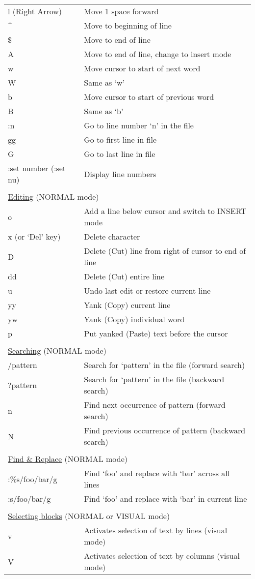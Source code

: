 \documentclass[11pt,a4paper,oneside]{article}
\begin{document}
\begin{table}
\begin{tabular}{p{4.5cm} l}
l (Right Arrow) & Move 1 space forward \\
\^{} & Move to beginning of line \\
\$ & Move to end of line \\
A & Move to end of line, change to insert mode \\
w & Move cursor to start of next word \\
W & Same as `w' \\
b & Move cursor to start of previous word \\
B & Same as `b' \\
:n & Go to line number `n' in the file \\
gg & Go to first line in file \\
G & Go to last line in file \\
:set number (:set nu) & Display line numbers \\
 & \\[-1.5ex]
\multicolumn{2}{l}{\underline{Editing} (NORMAL mode)} \\
o & Add a line below cursor and switch to INSERT mode \\
x (or `Del' key) & Delete character \\
D & Delete (Cut) line from right of cursor to end of line \\
dd & Delete (Cut) entire line \\
u & Undo last edit or restore current line \\
yy & Yank (Copy) current line \\
yw & Yank (Copy) individual word \\
p & Put yanked (Paste) text before the cursor \\
 & \\[-1.5ex]
\multicolumn{2}{l}{\underline{Searching} (NORMAL mode)} \\
/pattern & Search for `pattern' in the file (forward search) \\
?pattern & Search for `pattern' in the file (backward search) \\
n & Find next occurrence of pattern (forward search) \\
N & Find previous occurrence of pattern (backward search) \\
 & \\[-1.5ex]
\multicolumn{2}{l}{\underline{Find \& Replace} (NORMAL mode)} \\
:\%s/foo/bar/g & Find `foo' and replace with `bar' across all lines \\
:s/foo/bar/g & Find `foo' and replace with `bar' in current line \\
 & \\[-1.5ex]
\multicolumn{2}{l}{\underline{Selecting blocks} (NORMAL or VISUAL mode)} \\
v & Activates selection of text by lines (visual mode) \\
V & Activates selection of text by columns (visual mode) \\


\end{tabular}
\end{table}
\end{document}

